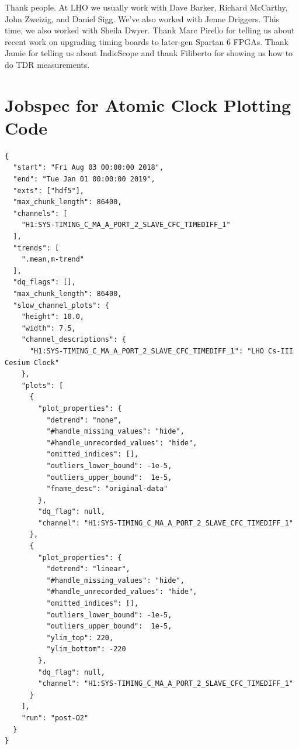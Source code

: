 \documentclass{article}
\newcommand*{\TODO}{\textcolor{todo}}
\begin{document}
\TODO{Thank people. At LHO we usually work with Dave Barker, Richard McCarthy, John Zweizig, and Daniel Sigg. We've also worked with Jenne Driggers. This time, we also worked with Sheila Dwyer. Thank Marc Pirello for telling us about recent work on upgrading timing boards to later-gen Spartan 6 FPGAs. Thank Jamie for telling us about IndieScope and thank Filiberto for showing us how to do TDR measurements. } 


\clearpage
\appendix
\section{Jobspec for Atomic Clock Plotting Code}
\label{sec:jobspec}
	\begin{lstlisting}
{
  "start": "Fri Aug 03 00:00:00 2018",
  "end": "Tue Jan 01 00:00:00 2019",
  "exts": ["hdf5"],
  "max_chunk_length": 86400,
  "channels": [
    "H1:SYS-TIMING_C_MA_A_PORT_2_SLAVE_CFC_TIMEDIFF_1"
  ],
  "trends": [
    ".mean,m-trend"
  ],
  "dq_flags": [],
  "max_chunk_length": 86400,
  "slow_channel_plots": {
    "height": 10.0,
    "width": 7.5,
    "channel_descriptions": {
      "H1:SYS-TIMING_C_MA_A_PORT_2_SLAVE_CFC_TIMEDIFF_1": "LHO Cs-III Cesium Clock"
    },
    "plots": [
      {
        "plot_properties": {
          "detrend": "none",
          "#handle_missing_values": "hide",
          "#handle_unrecorded_values": "hide",
          "omitted_indices": [],
          "outliers_lower_bound": -1e-5,
          "outliers_upper_bound":  1e-5,
          "fname_desc": "original-data"
        },
        "dq_flag": null,
        "channel": "H1:SYS-TIMING_C_MA_A_PORT_2_SLAVE_CFC_TIMEDIFF_1"
      },
      {
        "plot_properties": {
          "detrend": "linear",
          "#handle_missing_values": "hide",
          "#handle_unrecorded_values": "hide",
          "omitted_indices": [],
          "outliers_lower_bound": -1e-5,
          "outliers_upper_bound":  1e-5,
          "ylim_top": 220,
          "ylim_bottom": -220
        },
        "dq_flag": null,
        "channel": "H1:SYS-TIMING_C_MA_A_PORT_2_SLAVE_CFC_TIMEDIFF_1"
      }
    ],
    "run": "post-O2"
  }
}
\end{lstlisting}
\clearpage
\end{document}

